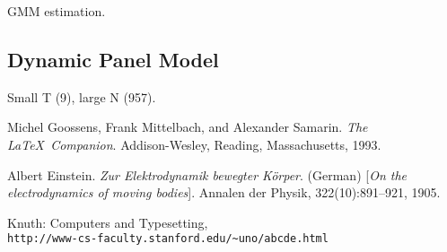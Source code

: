 \documentclass[11pt]{article}
\begin{document}
GMM estimation.

\subsection{Dynamic Panel Model}

Small T (9), large N (957). 


\makeatletter
\renewcommand\@biblabel[1]{}
\makeatother

\begin{thebibliography}{9}

Michel Goossens, Frank Mittelbach, and Alexander Samarin. 
\textit{The \LaTeX\ Companion}. 
Addison-Wesley, Reading, Massachusetts, 1993.

Albert Einstein. 
\textit{Zur Elektrodynamik bewegter K{\"o}rper}. (German) 
[\textit{On the electrodynamics of moving bodies}]. 
Annalen der Physik, 322(10):891–921, 1905.

Knuth: Computers and Typesetting,
\\\texttt{http://www-cs-faculty.stanford.edu/\~{}uno/abcde.html}
\end{thebibliography}
\end{document}

